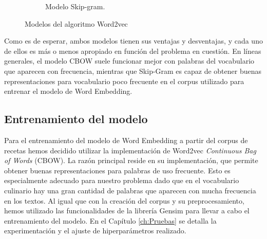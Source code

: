 \begin{figure}[h!]
\begin{subfigure}[b]{0.47\textwidth}
        \caption{Modelo Skip-gram.}
    \end{subfigure}
    \caption{Modelos del algoritmo Word2vec~\cite{rong2014word2vec}}
    \label{fig:modelos-w2v}
\end{figure}


Como es de esperar, ambos modelos tienen sus ventajas y desventajas, y cada uno de ellos es más o menos apropiado en función del problema en cuestión. En líneas generales, el modelo CBOW suele funcionar mejor con palabras del vocabulario que aparecen con frecuencia, mientras que Skip-Gram es capaz de obtener buenas representaciones para vocabulario poco frecuente en el corpus utilizado para entrenar el modelo de Word Embedding. 

\subsection{Entrenamiento del modelo}\label{subsec:train}
Para el entrenamiento del modelo de Word Embedding a partir del corpus de recetas hemos decidido utilizar la implementación de Word2vec \textit{Continuous Bag of Words} (CBOW). La razón principal reside en su implementación, que permite obtener buenas representaciones para palabras de uso frecuente. Esto es especialmente adecuado para nuestro problema dado que en el vocabulario culinario hay una gran cantidad de palabras que aparecen con mucha frecuencia en los textos. Al igual que con la creación del corpus y su preprocesamiento, hemos utilizado las funcionalidades de la librería Gensim para llevar a cabo el entrenamiento del modelo. En el Capítulo \ref{ch:Pruebas} se detalla la experimentación y el ajuste de hiperparámetros realizado.